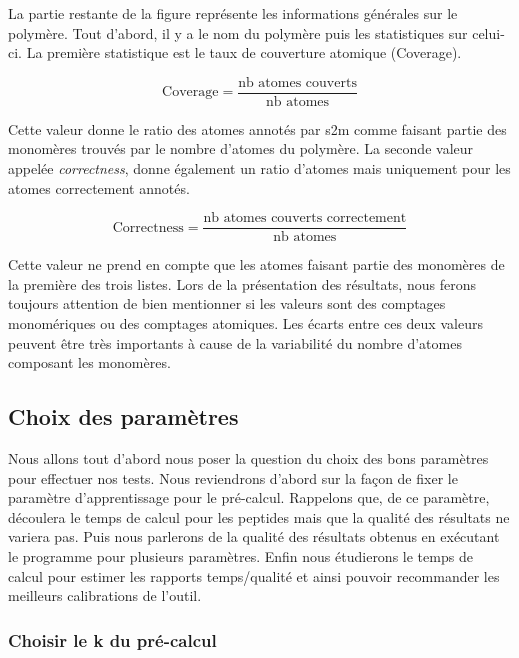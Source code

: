 La partie restante de la figure représente les informations générales sur le polymère.
Tout d'abord, il y a le nom du polymère puis les statistiques sur celui-ci.
La première statistique est le taux de couverture atomique (Coverage).

\begin{equation}
  \text{Coverage} = \frac{\text{nb atomes couverts}}{\text{nb atomes}}
\end{equation}


Cette valeur donne le ratio des atomes annotés par s2m comme faisant partie des monomères trouvés par le nombre d'atomes du polymère.
La seconde valeur appelée \textit{correctness}, donne également un ratio d'atomes mais uniquement pour les atomes correctement annotés.

\begin{equation}
  \text{Correctness} = \frac{\text{nb atomes couverts correctement}}{\text{nb atomes}}
\end{equation}

Cette valeur ne prend en compte que les atomes faisant partie des monomères de la première des trois listes.
Lors de la présentation des résultats, nous ferons toujours attention de bien mentionner si les valeurs sont des comptages monomériques ou des comptages atomiques.
Les écarts entre ces deux valeurs peuvent être très importants à cause de la variabilité du nombre d'atomes composant les monomères.





\subsection{Choix des paramètres}

\label{parameters_choice}

Nous allons tout d'abord nous poser la question du choix des bons paramètres pour effectuer nos tests.
Nous reviendrons d'abord sur la façon de fixer le paramètre d'apprentissage pour le pré-calcul.
Rappelons que, de ce paramètre, découlera le temps de calcul pour les peptides mais que la qualité des résultats ne variera pas.
Puis nous parlerons de la qualité des résultats obtenus en exécutant le programme pour plusieurs paramètres.
Enfin nous étudierons le temps de calcul pour estimer les rapports temps/qualité et ainsi pouvoir recommander les meilleurs calibrations de l'outil.

\subsubsection{Choisir le k du pré-calcul}
\label{k_res}

